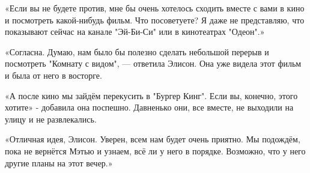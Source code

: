 \documentclass[a4paper,12pt]{book}
\begin{document}
\par
«Если вы не будете против, мне бы очень хотелось сходить вместе с вами в кино и посмотреть какой-нибудь фильм. Что посоветуете? Я даже не представляю, что показывают сейчас на канале "Эй-Би-Си" или в кинотеатрах "Одеон".»
\par
«Согласна. Думаю, нам было бы полезно сделать небольшой перерыв и посмотреть "Комнату с видом", — ответила Элисон. Она уже видела этот фильм и была от него в восторге.
\par
«А после кино мы зайдём перекусить в "Бургер Кинг". Если вы, конечно, этого хотите» - добавила она поспешно. Давненько они, все вместе, не выходили на улицу и не развлекались.
\par
«Отличная идея, Элисон. Уверен, всем нам будет очень приятно. Мы подождём, пока не вернётся Мэтью и узнаем, всё ли у него в порядке. Возможно, что у него другие планы на этот вечер.»
\end{document}
